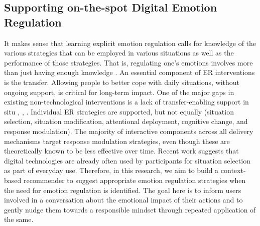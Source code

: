 \subsection{Supporting on-the-spot Digital Emotion Regulation}
It makes sense that learning explicit emotion regulation calls for knowledge of the various strategies that can be employed in various situations as well as the performance of those strategies. That is, regulating one's emotions involves more than just having enough knowledge \cite{slovak2022designing}. An essential component of ER interventions is the transfer. Allowing people to better cope with daily situations, without ongoing support, is critical for long-term impact. One of the major gaps in existing non-technological interventions is a lack of transfer-enabling support in situ \cite{slovak2016scaffolding}, \cite{antle2018opening}, \cite{antle2019design}. Individual ER strategies are supported, but not equally (situation selection, situation modification, attentional deployment, cognitive change, and response modulation). The majority of interactive components across all delivery mechanisms target response modulation strategies, even though these are theoretically known to be less effective over time. Recent work suggests that digital technologies are already often used by participants for situation selection as part of everyday use. Therefore, in this research, we aim to build a context-based recommender to suggest appropriate emotion regulation strategies when the need for emotion regulation is identified. The goal here is to inform users involved in a conversation about the emotional impact of their actions and to gently nudge them towards a responsible mindset through repeated application of the same.